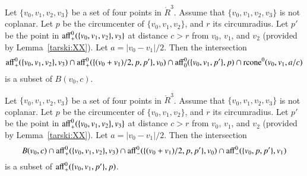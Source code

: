 \begin{tarskidata}
\begin{tarski}

\begin{lemma}
Let $\{v_0,v_1,v_2,v_3\}$ be a set of four points in $\ring{R}^3$.
Assume that $\{v_0,v_1,v_2,v_3\}$ is not coplanar.  Let $p$
be the circumcenter of $\{v_0,v_1,v_2\}$, and $r$ its circumradius.  
Let $p'$ be the
point in ${\operatorname{aff}}_+^0(\{v_0,v_1,v_2\},v_3\}$ at distance
$c > r$ from $v_0$, $v_1$, and $v_2$ (provided by Lemma~\ref{tarski:XX}).
Let $a = |v_0-v_1|/2$.
Then the intersection
  $$
  {\operatorname{aff}}^0_+(\{v_0,v_1,v_2\},v_3) \cap
  {\operatorname{aff}}^0_+(\{(v_0+v_1)/2,p,p' \},v_0) \cap
  {\operatorname{aff}}^0_0(\{v_0,v_1,p'\},p)\cap
  {\operatorname{rcone}}^0(v_0,v_1,a/c)
  $$
is a subset of $B(v_0,c)$.
\end{lemma}

\begin{proved}
\swallowed\end{proved}
\end{tarski}






\begin{tarski}

\begin{lemma}
Let $\{v_0,v_1,v_2,v_3\}$ be a set of four points in $\ring{R}^3$.
Assume that $\{v_0,v_1,v_2,v_3\}$ is not coplanar.  Let $p$
be the circumcenter of $\{v_0,v_1,v_2\}$, and $r$ its circumradius.  
Let $p'$ be the
point in ${\operatorname{aff}}_+^0(\{v_0,v_1,v_2\},v_3\}$ at distance
$c > r$ from $v_0$, $v_1$, and $v_2$ (provided by Lemma~\ref{tarski:XX}).
Let $a = |v_0-v_1|/2$.
Then the intersection
  $$
  B(v_0,c)\cap
  {\operatorname{aff}}^0_+(\{v_0,v_1,v_2\},v_3) \cap
  {\operatorname{aff}}^0_-(\{(v_0+v_1)/2,p,p' \},v_0) \cap
  {\operatorname{aff}}^0_-(\{v_0,p,p'\},v_1)
  $$
is a subset of ${\operatorname{aff}}^0_+(\{v_0,v_1,p'\},p)$.
\end{lemma}

\begin{proved}
\swallowed\end{proved}
\end{tarski}







\end{tarskidata}
